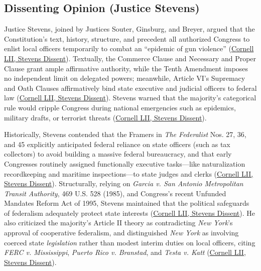 \documentclass[12pt]{article}
\begin{document}
\subsection{Dissenting Opinion (Justice Stevens)}
Justice Stevens, joined by Justices Souter, Ginsburg, and Breyer, argued that the Constitution's text, history, structure, and precedent all authorized Congress to enlist local officers temporarily to combat an ``epidemic of gun violence'' (\href{https://www.law.cornell.edu/supct/html/95-1478.ZD.html}{Cornell LII, Stevens Dissent}). Textually, the Commerce Clause and Necessary and Proper Clause grant ample affirmative authority, while the Tenth Amendment imposes no independent limit on delegated powers; meanwhile, Article VI's Supremacy and Oath Clauses affirmatively bind state executive and judicial officers to federal law (\href{https://www.law.cornell.edu/supct/html/95-1478.ZD.html}{Cornell LII, Stevens Dissent}). Stevens warned that the majority's categorical rule would cripple Congress during national emergencies such as epidemics, military drafts, or terrorist threats (\href{https://www.law.cornell.edu/supct/html/95-1478.ZD.html}{Cornell LII, Stevens Dissent}).

Historically, Stevens contended that the Framers in \textit{The Federalist} Nos. 27, 36, and 45 explicitly anticipated federal reliance on state officers (such as tax collectors) to avoid building a massive federal bureaucracy, and that early Congresses routinely assigned functionally executive tasks---like naturalization recordkeeping and maritime inspections---to state judges and clerks (\href{https://www.law.cornell.edu/supct/html/95-1478.ZD.html}{Cornell LII, Stevens Dissent}). Structurally, relying on \textit{Garcia v. San Antonio Metropolitan Transit Authority}, 469 U.S. 528 (1985), and Congress's recent Unfunded Mandates Reform Act of 1995, Stevens maintained that the political safeguards of federalism adequately protect state interests (\href{https://www.law.cornell.edu/supct/html/95-1478.ZD.html}{Cornell LII, Stevens Dissent}). He also criticized the majority's Article II theory as contradicting \textit{New York}'s approval of cooperative federalism, and distinguished \textit{New York} as involving coerced state \textit{legislation} rather than modest interim duties on local officers, citing \textit{FERC v. Mississippi}, \textit{Puerto Rico v. Branstad}, and \textit{Testa v. Katt} (\href{https://www.law.cornell.edu/supct/html/95-1478.ZD.html}{Cornell LII, Stevens Dissent}).
\end{document}

